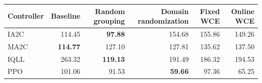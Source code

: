 \begin{tabular}{lrrrrr}
\hline
Controller & Baseline & Random grouping & Domain randomization & Fixed WCE & Online WCE \\
\hline
IA2C & 114.45 & \textbf{97.88} & 154.68 & 155.86 & 149.26 \\
MA2C & \textbf{114.77} & 127.10 & 127.81 & 135.62 & 137.50 \\
IQLL & 263.32 & \textbf{119.13} & 191.49 & 186.32 & 194.53 \\
PPO & 101.06 & 91.53 & \textbf{59.66} & 97.36 & 65.25 \\
\hline
\end{tabular}
